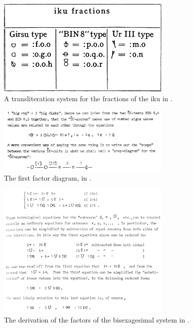 \documentclass[10pt, a4paper, twoside]{article}
\begin{document}
\begin{figure}[H]
  \begin{center}
  \includegraphics[width=0.75\textwidth]{powell-216.png}
  \caption{A transliteration system for the fractions of the iku in \cite[216]{Powell1972}.}
  \end{center}
\end{figure}
\begin{figure}[H]
  \begin{center}
  \includegraphics[width=0.75\textwidth]{friberg-10.png}
  \caption[]{The first factor diagram, in \cite[10]{Friberg1978}.\label{firstStepDiagram}}
  \end{center}
\end{figure}
\begin{figure}[H]
  \begin{center}
  \includegraphics[width=0.75\textwidth]{friberg-15.png}
  \caption[]{The derivation of the factors of the bisexagesimal system in \cite[15]{Friberg1978}\label{FribergEquations}\footnotemark.}
  \end{center}
\end{figure}
\end{document}
